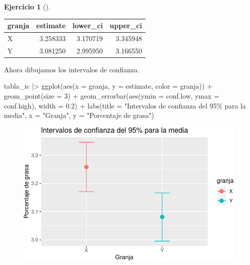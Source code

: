 \documentclass[
  a4paper,
]{scrreport}
\newenvironment{Shaded}{\begin{snugshade}}{\end{snugshade}}
\newcommand{\AttributeTok}[1]{\textcolor[rgb]{0.40,0.45,0.13}{#1}}
\newcommand{\DecValTok}[1]{\textcolor[rgb]{0.68,0.00,0.00}{#1}}
\newcommand{\FloatTok}[1]{\textcolor[rgb]{0.68,0.00,0.00}{#1}}
\newcommand{\FunctionTok}[1]{\textcolor[rgb]{0.28,0.35,0.67}{#1}}
\newcommand{\NormalTok}[1]{\textcolor[rgb]{0.00,0.23,0.31}{#1}}
\newcommand{\SpecialCharTok}[1]{\textcolor[rgb]{0.37,0.37,0.37}{#1}}
\newcommand{\StringTok}[1]{\textcolor[rgb]{0.13,0.47,0.30}{#1}}
\theoremstyle{definition}
\newtheorem{exercise}{Ejercicio}[chapter]
\theoremstyle{remark}
\begin{document}
\begin{exercise}[]
\begin{enumerate}
\begin{tcolorbox}
  \begin{longtable}[]{@{}lrrr@{}}
  \toprule\noalign{}
  granja & estimate & lower\_ci & upper\_ci \\
  \midrule\noalign{}
  \endhead
  \bottomrule\noalign{}
  \endlastfoot
  X & 3.258333 & 3.170719 & 3.345948 \\
  Y & 3.081250 & 2.995950 & 3.166550 \\
  \end{longtable}

  Ahora dibujamos los intervalos de confianza.

\begin{Shaded}
\begin{Highlighting}[]
\NormalTok{tabla\_ic  }\SpecialCharTok{|\textgreater{}} 
    \FunctionTok{ggplot}\NormalTok{(}\FunctionTok{aes}\NormalTok{(}\AttributeTok{x =}\NormalTok{ granja, }\AttributeTok{y =}\NormalTok{ estimate, }\AttributeTok{color =}\NormalTok{ granja)) }\SpecialCharTok{+}
    \FunctionTok{geom\_point}\NormalTok{(}\AttributeTok{size =} \DecValTok{3}\NormalTok{) }\SpecialCharTok{+}
    \FunctionTok{geom\_errorbar}\NormalTok{(}\FunctionTok{aes}\NormalTok{(}\AttributeTok{ymin =}\NormalTok{ conf.low, }\AttributeTok{ymax =}\NormalTok{ conf.high), }\AttributeTok{width =} \FloatTok{0.2}\NormalTok{) }\SpecialCharTok{+}
    \FunctionTok{labs}\NormalTok{(}\AttributeTok{title =} \StringTok{"Intervalos de confianza del 95\% para la media"}\NormalTok{, }\AttributeTok{x =} \StringTok{"Granja"}\NormalTok{, }\AttributeTok{y =} \StringTok{"Porcentaje de grasa"}\NormalTok{)}
\end{Highlighting}
\end{Shaded}

  \begin{figure}[H]

  {\centering \includegraphics{07-intervalos-confianza-una-poblacion_files/figure-pdf/unnamed-chunk-13-1.pdf}

}
\end{figure}
\end{tcolorbox}
\end{enumerate}
\end{exercise}
\end{document}
